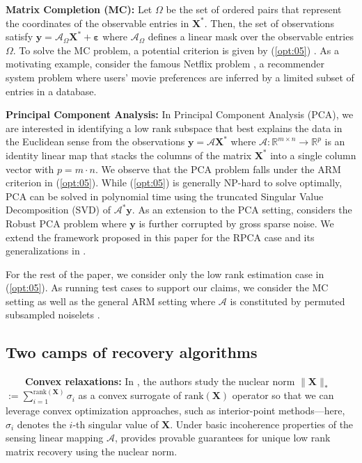 \documentclass[twocolumn]{svjour3}
\newcommand{\vectornorm}[1]{\|#1\|}
\newcommand{\obs}{\boldsymbol{y}}
\newcommand{\sensing}{\boldsymbol{\mathcal{A}}}
\newcommand{\signal}{\boldsymbol{X}}
\newcommand{\bestsignal}{\boldsymbol{X}^\ast}
\newcommand{\noise}{\boldsymbol{\varepsilon}}
\newcommand{\dimension}{m \times n}
\begin{document}
\textbf{Matrix Completion (MC):} Let $ \Omega $ be the set of ordered pairs that represent the coordinates of the observable entries in $\bestsignal$. Then, the set of observations satisfy $\obs = \sensing_{\Omega} \bestsignal + \noise$ where $\sensing_{\Omega} $ defines a linear mask over the observable entries $\Omega $. To solve the MC problem, a potential criterion is given by (\ref{opt:05}) \cite{candès2009exact}. As a motivating example, consider the famous Netflix problem \cite{netflix}, a recommender system problem where users' movie preferences are inferred by a limited subset of entries in a database. 

\textbf{Principal Component Analysis:} In Principal Component Analysis (PCA), we are interested in identifying a low rank subspace that best explains the data in the Euclidean sense from the observations $\obs = \sensing \bestsignal $ where $\sensing: \mathbb{R}^{\dimension} \rightarrow \mathbb{R}^p$ is an identity linear map that stacks the columns of the matrix $\bestsignal$ into a 
single column vector with $p = m \cdot n$. We observe that the PCA problem falls under the ARM criterion in (\ref{opt:05}). While (\ref{opt:05}) is generally NP-hard to solve optimally, PCA can be solved in polynomial time using the truncated Singular Value Decomposition (SVD) of $\sensing^{\ast} \obs$. As an extension to the PCA setting, \cite{candes2011robust} considers the Robust PCA problem where $\boldsymbol{y}$ is further corrupted by gross sparse noise. We extend the framework proposed in this paper for the RPCA case and its generalizations in \cite{KyrillidisCevherSSP}.

For the rest of the paper, we consider only the low rank estimation case in (\ref{opt:05}). As running test cases to support our claims, we consider the MC setting as well as the general ARM setting where $\sensing$ is constituted by permuted subsampled noiselets \cite{sparcs}. 

\subsection{Two camps of recovery algorithms}

~~~~\textbf{Convex relaxations:} In \cite{brecht2010}, the authors study the nuclear norm $ \vectornorm{\signal}_{\ast} $ $:= \sum_{i = 1}^{\text{rank}(\signal)} \sigma_{i} $ as a convex surrogate of $ \text{rank}(\signal) $ operator so that we can leverage convex optimization approaches, such as interior-point methods---here, $\sigma_i$ denotes the $i$-th singular value of $\signal$. Under basic incoherence properties of the sensing linear mapping $ \sensing $, \cite{brecht2010} provides provable guarantees for unique low rank matrix recovery using the nuclear norm.
\end{document}
